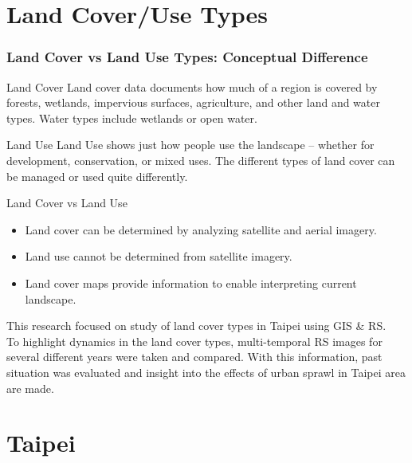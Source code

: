 \documentclass[pdflatex,compress,8pt,
	xcolor={dvipsnames,dvipsnames,svgnames,x11names,table},
	hyperref={colorlinks = true,breaklinks = true, urlcolor = NavyBlue, breaklinks = true}]{beamer}
\begin{document}
\section{Land Cover/Use Types}
\begin{frame}\frametitle{Land Cover vs Land Use Types: Conceptual Difference}

\begin{alertblock}{Land Cover}
Land cover data documents how much of a region is covered by forests, wetlands, impervious surfaces, agriculture, and other land and water types. 
Water types include wetlands or open water.
\end{alertblock}

\begin{block}{Land Use}
Land Use shows just how people use the landscape – whether for development, conservation, or mixed uses. The different types of land cover can be managed or used quite differently.
\end{block}

\begin{examples}{Land Cover vs Land Use}
\begin{itemize}
	\item Land cover can be determined by analyzing satellite and aerial imagery.
	\item Land use cannot be determined from satellite imagery.
	\item Land cover maps provide information to enable interpreting current landscape.
\end{itemize}
\end{examples}

This research focused on study of land cover types in Taipei using GIS \& RS.\\
To highlight dynamics in the land cover types, multi-temporal RS images for several different years were taken and compared. 
With this information, past situation was evaluated and insight into the effects of urban sprawl in Taipei area are made.
\end{frame}

\section{Taipei}
\end{document}
